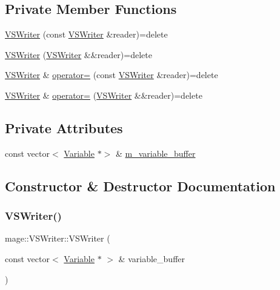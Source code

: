\subsection*{Private Member Functions}
\begin{DoxyCompactItemize}
\item 
\hyperlink{classmage_1_1_v_s_writer_ac832695702725d55e8b5ded2917758d9}{V\+S\+Writer} (const \hyperlink{classmage_1_1_v_s_writer}{V\+S\+Writer} \&reader)=delete
\item 
\hyperlink{classmage_1_1_v_s_writer_a0ea80ce74f51eb63512b0fa13577bf30}{V\+S\+Writer} (\hyperlink{classmage_1_1_v_s_writer}{V\+S\+Writer} \&\&reader)=delete
\item 
\hyperlink{classmage_1_1_v_s_writer}{V\+S\+Writer} \& \hyperlink{classmage_1_1_v_s_writer_a3c961e3ef27f93b5ecf953c81844f6c6}{operator=} (const \hyperlink{classmage_1_1_v_s_writer}{V\+S\+Writer} \&reader)=delete
\item 
\hyperlink{classmage_1_1_v_s_writer}{V\+S\+Writer} \& \hyperlink{classmage_1_1_v_s_writer_a33859922757212edae1010fce699e3af}{operator=} (\hyperlink{classmage_1_1_v_s_writer}{V\+S\+Writer} \&\&reader)=delete
\end{DoxyCompactItemize}
\subsection*{Private Attributes}
\begin{DoxyCompactItemize}
\item 
const vector$<$ \hyperlink{structmage_1_1_variable}{Variable} $\ast$$>$ \& \hyperlink{classmage_1_1_v_s_writer_a4fa655fa7c7d09a9439a22061ceab0f4}{m\+\_\+variable\+\_\+buffer}
\end{DoxyCompactItemize}


\subsection{Constructor \& Destructor Documentation}
\hypertarget{classmage_1_1_v_s_writer_a401e3661cf197c20a011792221443e8f}{}\label{classmage_1_1_v_s_writer_a401e3661cf197c20a011792221443e8f} 
\subsubsection{\texorpdfstring{V\+S\+Writer()}{VSWriter()}\hspace{0.1cm}{\footnotesize\ttfamily [1/3]}}
{\footnotesize\ttfamily mage\+::\+V\+S\+Writer\+::\+V\+S\+Writer (\begin{DoxyParamCaption}\item[{const vector$<$ \hyperlink{structmage_1_1_variable}{Variable} $\ast$ $>$ \&}]{variable\+\_\+buffer }\end{DoxyParamCaption})}

